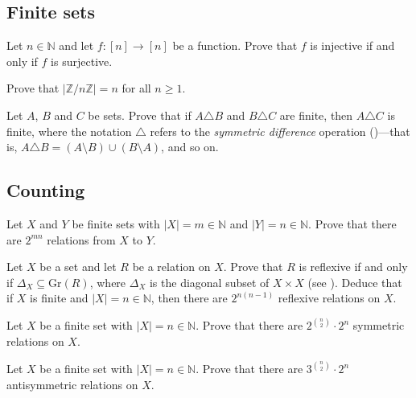 \subsection*{Finite sets}

\begin{chapex}
Let $n \in \mathbb{N}$ and let $f : [n] \to [n]$ be a function. Prove that $f$ is injective if and only if $f$ is surjective.
\end{chapex}

\begin{chapex}
Prove that $|\mathbb{Z}/n\mathbb{Z}|=n$ for all $n \ge 1$.
\end{chapex}

\begin{chapex}
Let $A$, $B$ and $C$ be sets. Prove that if $A \triangle B$ and $B \triangle C$ are finite, then $A \triangle C$ is finite, where the notation $\triangle$ refers to the \textit{symmetric difference} operation ()---that is, $A \triangle B = (A \setminus B) \cup (B \setminus A)$, and so on.
\end{chapex}

\subsection*{Counting}

\begin{chapex}
Let $X$ and $Y$ be finite sets with $|X|=m \in \mathbb{N}$ and $|Y|=n \in \mathbb{N}$. Prove that there are $2^{mn}$ relations from $X$ to $Y$.
\end{chapex}

\begin{chapex}
Let $X$ be a set and let $R$ be a relation on $X$. Prove that $R$ is reflexive if and only if $\Delta_X \subseteq \mathrm{Gr}(R)$, where $\Delta_X$ is the diagonal subset of $X \times X$ (see ). Deduce that if $X$ is finite and $|X|=n \in \mathbb{N}$, then there are $2^{n(n-1)}$ reflexive relations on $X$.
\end{chapex}

\begin{chapex}
Let $X$ be a finite set with $|X|=n \in \mathbb{N}$. Prove that there are $2^{\binom{n}{2}} \cdot 2^n$ symmetric relations on $X$.
\end{chapex}

\begin{chapex}
Let $X$ be a finite set with $|X|=n \in \mathbb{N}$. Prove that there are $3^{\binom{n}{2}} \cdot 2^n$ antisymmetric relations on $X$.
\end{chapex}


